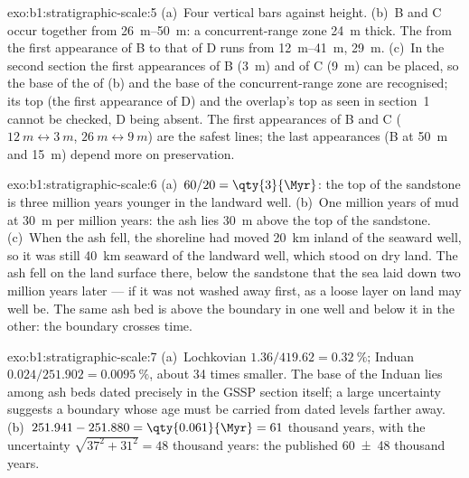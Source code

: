 \begin{solution}{exo:b1:stratigraphic-scale:5}
(a)~Four vertical bars against height. (b)~B and C occur together from
\qtyrange{26}{50}{m}: a concurrent-range zone \qty{24}{m} thick. The  from the first appearance of B to that of D runs from \qtyrange{12}{41}{m},
\qty{29}{m}. (c)~In the second section the first appearances of B (\qty{3}{m})
and of C (\qty{9}{m}) can be placed, so the base of the  of (b) and
the base of the concurrent-range zone are recognised; its top (the first
appearance of D) and the overlap's top as seen in section~1 cannot be checked,
D being absent. The first appearances of B and C ($\qty{12}{m} \leftrightarrow
\qty{3}{m}$, $\qty{26}{m} \leftrightarrow \qty{9}{m}$) are the safest lines; the
last appearances (B at \qty{50}{m} and \qty{15}{m}) depend more on preservation.
\end{solution}

\begin{solution}{exo:b1:stratigraphic-scale:6}
(a)~$60/20 = \qty{3}{\Myr}$: the top of the sandstone is three million years
younger in the landward well. (b)~One million years of mud at \qty{30}{m} per
million years: the ash lies \qty{30}{m} above the top of the sandstone.
(c)~When the ash fell, the shoreline had moved \qty{20}{km} inland of the seaward
well, so it was still \qty{40}{km} seaward of the landward well, which stood on
dry land. The ash fell on the land surface there, below the sandstone that the
sea laid down two million years later --- if it was not washed away first, as a
loose layer on land may well be. The same ash bed is above the  boundary in
one well and below it in the other: the boundary crosses time.
\end{solution}

\begin{solution}{exo:b1:stratigraphic-scale:7}
(a)~Lochkovian $1.36/419.62 = \qty{0.32}{\%}$; Induan $0.024/251.902 =
\qty{0.0095}{\%}$, about 34 times smaller. The base of the Induan lies among ash
beds dated precisely in the GSSP section itself; a large uncertainty suggests a
boundary whose age must be carried from dated levels farther away.
(b)~$251.941 - 251.880 = \qty{0.061}{\Myr} = 61$ thousand years, with the
uncertainty $\sqrt{37^2 + 31^2} = 48$ thousand years: the published
\num[uncertainty-mode=separate]{60 \pm 48} thousand years.
\end{solution}

